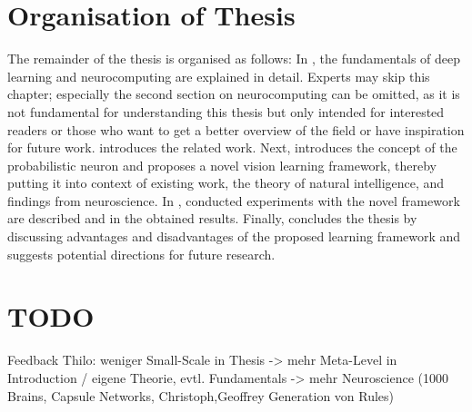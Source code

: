 \section{Organisation of Thesis}
The remainder of the thesis is organised as follows: In , the fundamentals of deep learning and neurocomputing are explained in detail.
Experts may skip this chapter; especially the second section on neurocomputing can be omitted, as it is not fundamental for understanding this thesis but only intended for interested readers or those who want to get a better overview of the field or have inspiration for future work.
 introduces the related work. Next,  introduces the concept of the probabilistic neuron and proposes a novel vision learning framework, thereby putting it into context of existing work, the theory of natural intelligence, and findings from neuroscience.
In , conducted experiments with the novel framework are described and in  the obtained results.
Finally,  concludes the thesis by discussing advantages and disadvantages of the proposed learning framework and suggests potential directions for future research.

\section{TODO}
Feedback Thilo: weniger Small-Scale in Thesis -> mehr Meta-Level in Introduction / eigene Theorie, evtl. Fundamentals -> mehr Neuroscience (1000 Brains, Capsule Networks, Christoph,Geoffrey Generation von Rules)




